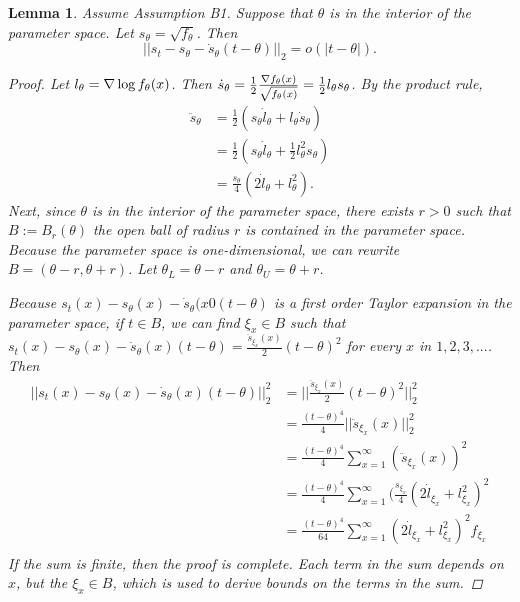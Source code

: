 \documentclass[11 pt]{article}
\newtheorem{lem}{Lemma}
\renewcommand{\th}{\theta}
\newcommand{\ddsth}{\ddot{s}_{\theta}}
\newcommand{\dsth}{\dot{s}_{\theta}}
\newcommand{\sth}{s_{\th}}
\newcommand{\lth}{l_{\th}}
\newcommand{\dlth}{\dot{l}_{\th}}
\begin{document}
\begin{lem}
\label{lem:l2diff1}
Assume Assumption B1. Suppose that $\th$ is in the interior of the parameter space. Let $\sth = \sqrt{f_{\th}}$. Then
\[
||s_{t}  - s_{\th} - \dsth(t-\th) ||_2 = o(|t - \th|).
\]
\newcommand{\dth}{\frac{d}{d \th}}
\newcommand{\ddth}{\frac{d^2}{d \th^2}}
\begin{proof}
Let $\lth = \nabla \log \fth$. Then $\dsth = \frac{1}{2} \frac{\nabla \fth}{\sqrt{\fth}} = \frac{1}{2} \lth \sth$. By the product rule,
\begin{align*}
\ddsth &= \frac{1}{2}(\sth \dlth + \lth \dsth ) \\
&= \frac{1}{2}(\sth \dlth + \frac{1}{2}\lth^2 \sth ) \\
&= \frac{\sth}{4}(2 \dlth + \lth^2) .
\end{align*}
\newcommand{\thl}{\theta_L}
\newcommand{\thu}{\theta_U}
\newcommand{\xix}{\xi_x}
\newcommand{\sxix}{s_{\xix}}
\newcommand{\lxix}{l_{\xix}}
\newcommand{\fxix}{f_{\xix}}
\newcommand{\dxix}{\frac{d}{d \xix}}
Next, since $\th$ is in the interior of the parameter space, there exists $r>0$ such that $B:=B_r(\th)$ the open ball of radius $r$ is contained in the parameter space. Because the parameter space is one-dimensional, we can rewrite $B = (\th - r, \th + r)$. Let $\thl = \th - r$ and $\thu = \th + r$.

Because $s_t(x) - \sth(x) - \dsth(x0 (t - \th)$ is a first order Taylor expansion in the parameter space, if $t \in B$, we can find $\xi_x \in B$  such that $s_t(x) - \sth(x) - \dsth(x) (t - \th) = \frac{\ddot{s}_{\xix}(x)}{2}(t - \th)^2$ for every $x$ in $1,2,3,...$. Then
\begin{align*}
||s_t(x) - \sth(x) - \dsth(x) (t - \th)||_2^2 &= ||\frac{\ddot{s}_{\xix}(x)}{2}(t - \th)^2||_2^2 \\
&= \frac{(t-\th)^4}{4} || \ddot{s}_{\xix}(x)||_2^2 \\
&= \frac{(t-\th)^4}{4} \sum_{x=1}^{\infty} (\ddot{s}_{\xix} (x))^2 \\
&= \frac{(t-\th)^4}{4} \sum_{x=1}^{\infty} (\frac{\sxix}{4}(2 \dot{l}_{\xix} + \lxix^2)^2 \\
&= \frac{(t-\th)^4}{64} \sum_{x=1}^{\infty} (2 \dot{l}_{\xix} + \lxix^2)^2\fxix \\
\end{align*}
If the sum is finite, then the proof is complete. Each term in the sum depends on $x$, but the $\xix \in B$, which is used to derive bounds on the terms in the sum.


\end{proof}
\end{lem}
\end{document}
